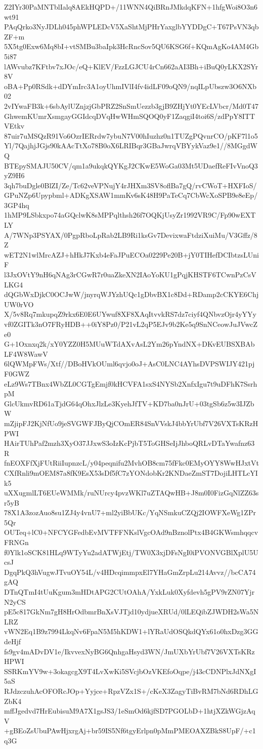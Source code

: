 Z2IYr30PaMNTblIalq8AEkHQPD+/11WNN4QiBRnJMkdqKFN+1hfgWoi8O3n6wt91
PAqQrko3NyJDLh045phWPLEDcV5XaShtMjPHrYaxglbYYDDgC+T67PsVN3qbZF+m
5X5tg0Exw6Mq8bI+vtSMBu3baIpk3HcRncSov5QU6KSG6f+KQmAgKo4AM4Gb5i87
lAWvubz7KFtbv7xJOc/eQ+KlEV/FzzLGJCU4rCn662aAI3Bh+iBuQ0yLKX2SYr8V
oBA+Pp0RSdk+dDYmIrc3A1oyUhmIVlI4fv4idLF09oQN9/nqILpUbszw3O6NXb02
2vIYwaFB3k+6sbAylUZnjzjGbPRZ2SnSmUezzb3gjB9ZHjYt0YEcLVbcr/Md0T47
GhwemKUmrXsmgayGGIdcqDVqHwWHmSQOQ0yF1ZaqgiI4toi6S/zdPpY8ITTVEtkv
87uir7uMSQzR91Vo6OzrIERrdw7ybuN7V00hIuzhz0n1TUZgPQvnrCO/pKF7l1o5
Yl/7QajhjJGjs90kAAcTtXo78B0oX6LRIBqr3GBaJwrqVBYykVaz9e1//8MGgdWQ
BTEpySMAJU50CV/qm1a9ukqkQYKgJ2CKwE5WoGa03Mt5UDaefReFIvVnoQ3yZ9H6
3qh7buDgle0BlZI/Ze/Tc62veVPNujY4rJHXm3SV8oflBa7gQ/rvCWoT+HXFIoS/
GPuNZp6Upypbml+ADKgXSAW1mmKv6sK48H9PaTeCq7CbWcXoSPB9e8eEp/3GP4hq
1hMP9LSbkxpo74aGQclwK8sMPPqlthsh26f7OQKjUsyZr1992VR9C/Fp90wEXTLY
A/7WNp3PSYAX/0PgpRboLpRab2LB9Ri1ksGv7DevixwaFtdziXuiMu/V3Gffz/8Z
wET2N1wlMrcAZJ+hHkJ7Kxb4eFaJPuECOa0229Pe20B+jY0TIHefDCIbtzsLUniF
l3JxOVtY9nH6qNAg3rCGwR7r0uaZkeXN2IAoYoKU1gPqjKHSTF6TCwnPzCsVLKG4
dQGbWxDjkC0OCJwW/jnyrqWJYzhUQc1gDbvBX1c8Dd+RDamp2cCKYE6ChjUW0rVO
X/5v8Rq7mkupqZ9rkx6E0E6UYwuf8XF8XAqItvvkRS7dz7ciyf4QNbvzOjr4yYYy
vf0ZGITk3nO7FRyHDB++0iY8Pz0/P21vL2qP5EJv9b2Ke5q9SnNCeowJuJVwcZe0
G+1Oxnxq2k/xY0YZZ0H5MUuWTdAXvAsL2Ym26pYndNX+DKvEUBSXBAbLF4W8WawV
6lQWMpFWs/Xtf//DBoHVkOUml6qvjo0oJ+AsC0LNC4AYhsDVPSWIJY421pjF0GWZ
eLz9Ws7TBnx4WbZL0CGTgEmjf0kHCVFA1sxS4NYSb2XnfxIgu7t9uDFhK7SsrhpM
GlcUkmvRD61aTjdG64qOhxJlzLe3KyehJfTV+KD7ba0nJrU+03tgSb6z5w3IJZbW
mZjipFJ2KjNfUo9jeSVGWFJByQjCOmER84SnVVskJ4bbYrUbf7V26VXTsKRzHPWI
HAirTUhPaf2mzh3XyO37JJxwS3oIzKcPjbT5ToGHSeIjJhboQRLvDTaYwafnz63R
fnEOXFfXjFUtRiiIupnzcL/y04peqnifu2MvhOB8cm75fFkc0EMyOYY8WwHJxtVt
CXfRnli9mOEM87a8fK9EsX53sDf5fC7zYONdobKr2KNDaeZmST7DojiLHTLcYIk5
uXXugmlLT6EUeWMMk/ruNUrcy4pvzWKl7uZTAQwHB+J8m0I0FizGqNlZZ63sr5yB
78X1A3zozAuo8su1ZJ4y4vnU7+ml2yiBbUKc/YqNSmkuCZQj2IOWFXeWg1ZPr5Qr
OUTeq+lC0+NFCYGFedbEvMVTFFNKslVgcOAd9nBznolPtx4B4GKWsmhqqcvFRNGn
f0Ylk1oSCK81HLq9WTyYu2adATWjEtj/TW0X3xjDFsNgI0iPVONVGBlXplU5UcsJ
DgqPkQ3hVugwJTvuOY54L/v4HDcqimmpxEl7YHaGmZrpLu214Avvz//bcCA74gAQ
DTnQTmI4tUuKgum3mHDtAPG2CUtOAhA/YxkLuk0Xyfdevh5gPV9rZN07YjrN2yCS
pE5c817GkNm7gH8HrOdbmrBnXsVJTjd10ydjueXRUd/0lLEQibZJWDH2sWa5NLRZ
vWN2Eq1B9z7994LkqNv6FpaN5M5hKDW1+lYRaUdOSQkdQYx61o0hxDzg3GGdeHjf
fs9gv4mADvDV1e/IkvvexNyBG6QnhgaHsyd3WN/JmUXbYrUbf7V26VXTsKRzHPWI
SSRKmYV9w+3okagcgX9T4LvXwKi5SVcjbOzVKEfoOqpe/j43cCDNPlxJdNXgI5aS
RJdzczuhAcOFORcJOp+Yyjce+RpzVZx1S+/cKeX3ZagyTiBvRM7bNd6RDhLGZbK4
mffJgedvd7HrEubisuM9A7X1gsJS3/1eSmOd6kjfSD7PGOLbD+1htjXZkWGjzAqV
+gBEoZsUbuPAwHjxrgAj+br59IS5Nf6tgyErlpn0pMmPMEOAXZBkS8UpF/+c1q3G
